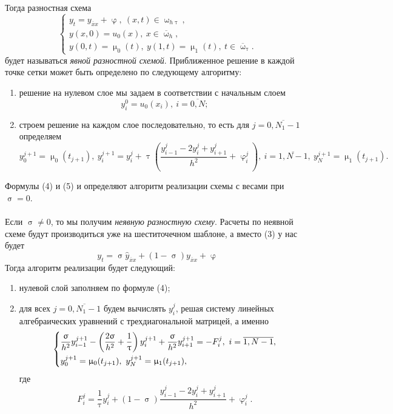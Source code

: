 \documentclass[a4paper, 12pt]{report}
\numberwithin{equation}{section}
\newcommand{\ol}{\overline}
\renewcommand{\varphi}{\upvarphi}
\renewcommand{\tau}{\uptau}
\renewcommand{\sigma}{\upsigma}
\renewcommand{\mu}{\upmu}
\renewcommand{\omega}{\upomega}
\begin{document}
		Тогда разностная схема $$\begin{cases}
				y_t = y_{\ol x x} + \varphi,\ (x,t)\in \omega_{h\tau}, \\
				y(x,0) = u_0(x),\ x \in \ol \omega_h,\\
				y(0, t) = \mu_0(t),\ y(1,t) = \mu_1(t),\ t \in \ol \omega_\tau.
		\end{cases}$$ будет называться \textit{явной разностной схемой}. Приближенное решение в каждой точке сетки может быть определено по следующему алгоритму:
		\begin{enumerate}
			\item решение на нулевом слое мы задаем в соответствии с начальным слоем
			\begin{equation}
				y_i^0 = u_0(x_i),\ i = \ol {0,N};
			\end{equation}
			\item строем решение на каждом слое последовательно, то есть для $j = \ol{0, N_1 - 1}$ определяем
			\begin{equation}
				y_0^{j+1} = \mu_0(t_{j+1}),\ y_i^{j+1} = y_i^j + \tau \left(\dfrac{y_{i-1}^j - 2 y_i^j + y_{i+1}^j}{h^2} + \varphi_i^j\right),\ i = \ol{1, N-1},\ y_N^{j+1} = \mu_1(t_{j+1}).
			\end{equation}
		\end{enumerate}
		Формулы (4) и (5) и определяют алгоритм реализации схемы с весами при $\sigma = 0$. \\\\
		Если $\sigma \ne 0$, то мы получим \textit{неявную разностную схему}. Расчеты по неявной схеме будут производиться уже на шеститочечном шаблоне, а вместо (3) у нас будет
		\begin{equation}
			y_t = \sigma \hat y_{\ol x x} + (1- \sigma)y_{\ol x x} + \varphi
		\end{equation}
		Тогда алгоритм реализации будет следующий:
		\begin{enumerate}
			\item нулевой слой заполняем по формуле (4);
			\item для всех $j = \ol {0, N_1-1}$ будем вычислять $y_i^j$, решая систему линейных алгебраических уравнений с трехдиагональной матрицей, а именно
			\begin{equation}
				\begin{dcases}
				\dfrac{\sigma}{h^2}y_{i-1}^{j+1} - \left(\dfrac{2\sigma}{h^2} + \dfrac 1 \tau\right) y_i^{j+1} + \dfrac {\sigma}{h^2} y_{i+1}^{j+1} = - F_i^j,\ i = \overline {1, N-1},\\
				y_0^{j+1} = \mu_0(t_{j+1}),\ y_N^{j+1} = \mu_1(t_{j+1}),
			\end{dcases}
			\end{equation}
			где $$F_i^j = \dfrac 1 \tau y_i^j + (1-\sigma) \dfrac{y_{i-1}^j - 2 y_i^j + y_{i+1}^j}{h^2} + \varphi_i^j.$$
		\end{enumerate}
\end{document}
